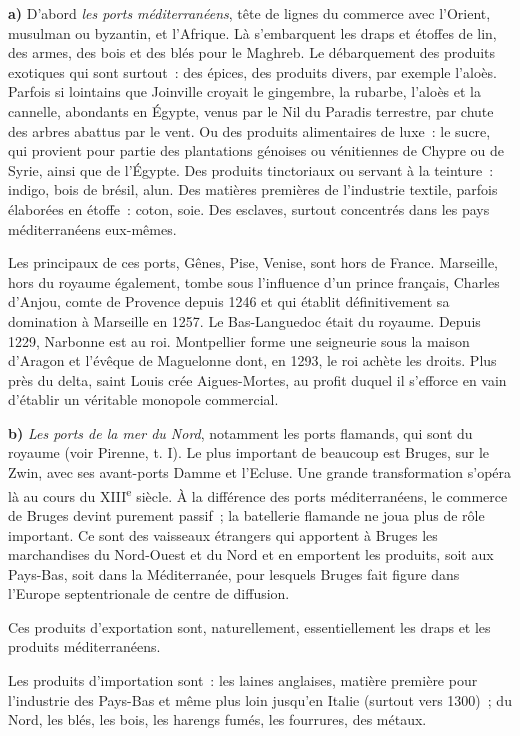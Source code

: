 \documentclass[french,twoside]{book} %
\newcommand{\labelchar}[1]{\textbf{\color{rubric} #1}}
\begin{document}
\noindent \labelchar{a)} D’abord {\itshape les ports méditerranéens}, tête de lignes du commerce avec l’Orient, musulman ou byzantin, et l’Afrique. Là s’embarquent les draps et étoffes de lin, des armes, des bois et des blés pour le Maghreb. Le débarquement des produits exotiques qui sont surtout : des épices, des produits divers, par exemple l’aloès. Parfois si lointains que Joinville croyait le gingembre, la rubarbe, l’aloès et la cannelle, abondants en Égypte, venus par le Nil du Paradis terrestre, par chute des arbres abattus par le vent. Ou des produits alimentaires de luxe : le sucre, qui provient pour partie des plantations génoises ou vénitiennes de Chypre ou de Syrie, ainsi que de l’Égypte. Des produits tinctoriaux ou servant à la teinture : indigo, bois de brésil, alun. Des matières premières de l’industrie textile, parfois élaborées en étoffe : coton, soie. Des esclaves, surtout concentrés dans les pays méditerranéens eux-mêmes.\par
Les principaux de ces ports, Gênes, Pise, Venise, sont hors de France. Marseille, hors du royaume également, tombe sous l’influence d’un prince français, Charles d’Anjou, comte de Provence depuis 1246 et qui établit définitivement sa domination à Marseille en 1257. Le Bas-Languedoc était du royaume. Depuis 1229, Narbonne est au roi. Montpellier forme une seigneurie sous la maison d’Aragon et l’évêque de Maguelonne dont, en 1293, le roi achète les droits. Plus près du delta, saint Louis crée Aigues-Mortes, au profit duquel il s’efforce en vain d’établir un véritable monopole commercial.\par
\bigbreak
\noindent \labelchar{b)} {\itshape Les ports de la mer du Nord}, notamment les ports flamands, qui sont du royaume (voir Pirenne, t. I). Le plus important de  
\label{p85} beaucoup est Bruges, sur le Zwin, avec ses avant-ports Damme et l’Ecluse. Une grande transformation s’opéra là au cours du XIII\textsuperscript{e} siècle. À la différence des ports méditerranéens, le commerce de Bruges devint purement passif ; la batellerie flamande ne joua plus de rôle important. Ce sont des vaisseaux étrangers qui apportent à Bruges les marchandises du Nord-Ouest et du Nord et en emportent les produits, soit aux Pays-Bas, soit dans la Méditerranée, pour lesquels Bruges fait figure dans l’Europe septentrionale de centre de diffusion.\par
Ces produits d’exportation sont, naturellement, essentiellement les draps et les produits méditerranéens.\par
Les produits d’importation sont : les laines anglaises, matière première pour l’industrie des Pays-Bas et même plus loin jusqu’en Italie (surtout vers 1300) ; du Nord, les blés, les bois, les harengs fumés, les fourrures, des métaux.\par
\end{document}
